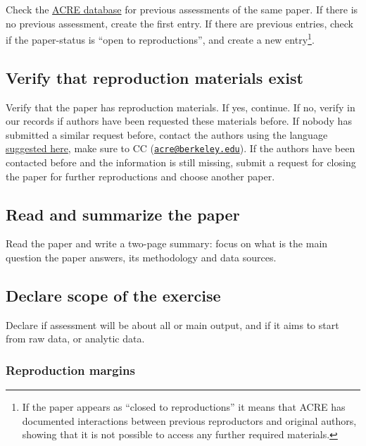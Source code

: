 \documentclass[]{book}
\begin{document}
Check the \href{ADD\%20LINK}{ACRE database} for previous assessments of the same paper. If there is no previous assessment, create the first entry. If there are previous entries, check if the paper-status is ``open to reproductions'', and create a new entry\footnote{If the paper appears as ``closed to reproductions'' it means that ACRE has documented interactions between previous reproductors and original authors, showing that it is not possible to access any further required materials. }.

\hypertarget{verify-that-reproduction-materials-exist}{%
\subsection{Verify that reproduction materials exist}\label{verify-that-reproduction-materials-exist}}

Verify that the paper has reproduction materials. If yes, continue. If no, verify in our records if authors have been requested these materials before. If nobody has submitted a similar request before, contact the authors using the language \href{add\%20link}{suggested here}, make sure to CC (\href{mailto:acre@berkeley.edu}{\nolinkurl{acre@berkeley.edu}}). If the authors have been contacted before and the information is still missing, submit a request for closing the paper for further reproductions and choose another paper.

\hypertarget{read-and-summarize-the-paper}{%
\subsection{Read and summarize the paper}\label{read-and-summarize-the-paper}}

Read the paper and write a two-page summary: focus on what is the main question the paper answers, its methodology and data sources.

\hypertarget{declare-scope-of-the-exercise}{%
\subsection{Declare scope of the exercise}\label{declare-scope-of-the-exercise}}

Declare if assessment will be about all or main output, and if it aims to start from raw data, or analytic data.

\hypertarget{reproduction-margins}{%
\subsubsection{Reproduction margins}\label{reproduction-margins}}
\end{document}
